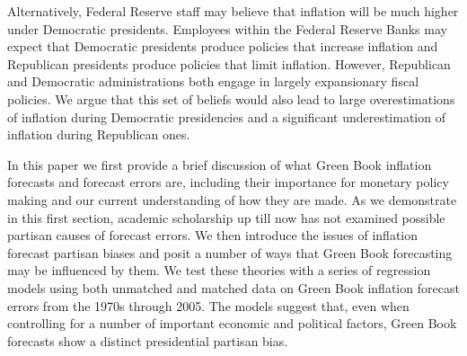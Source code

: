\documentclass[a4paper]{article}\usepackage{graphicx, color}
\begin{document}
Alternatively, Federal Reserve staff may believe that inflation will be much higher under Democratic presidents. Employees within the Federal Reserve Banks may expect that Democratic presidents produce policies that increase inflation and Republican presidents produce policies that limit inflation. However, Republican and Democratic administrations both engage in largely expansionary fiscal policies. We argue that this set of beliefs would also lead to large overestimations of inflation during Democratic presidencies and a significant underestimation of inflation during Republican ones.



In this paper we first provide a brief discussion of what Green Book inflation forecasts and forecast errors are, including their importance for monetary policy making and our current understanding of how they are made. As we demonstrate in this first section, academic scholarship up till now has not examined possible partisan causes of forecast errors. We then introduce the issues of inflation forecast partisan biases and posit a number of ways that Green Book forecasting may be influenced by them. We test these theories with a series of regression models using both unmatched and matched data on Green Book inflation forecast errors from the 1970s through 2005. The models suggest that, even when controlling for a number of important economic and political factors, Green Book forecasts show a distinct presidential partisan bias. 
\end{document}
